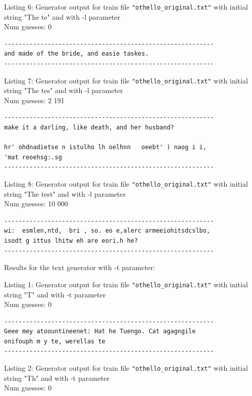 \documentclass{article}
\begin{document}
Listing 6: Generator output for train file \verb|"othello_original.txt"| with initial string "The te" and with -l parameter
\\Num guesses: 0

\begin{lstlisting}
----------------------------------------------------------
and made of the bride, and easie taskes.
----------------------------------------------------------
\end{lstlisting}

Listing 7: Generator output for train file \verb|"othello_original.txt"| with initial string "The tes" and with -l parameter
\\Num guesses: 2 191

\begin{lstlisting}
----------------------------------------------------------
make it a darling, like death, and her husband?

hr' ohdnadietse n istulho lh oelhnn   oeebt' ) naog i i, 
'mat reoehsg:.sg
----------------------------------------------------------
\end{lstlisting}

Listing 8: Generator output for train file \verb|"othello_original.txt"| with initial string "The test" and with -l parameter
\\Num guesses: 10 000

\begin{lstlisting}
----------------------------------------------------------
wi:  esmlen,ntd,  bri , so. eo e,alerc armeeiohitsdcslbo,
isodt g ittus lhitw eh are eori.h he?
----------------------------------------------------------
\end{lstlisting}



Results for the text generator with -t parameter:


\hfill

Listing 1: Generator output for train file \verb|"othello_original.txt"| with initial string "T" and with -t parameter
\\Num guesses: 0

\begin{lstlisting}
----------------------------------------------------------
Geee mey atoountineenet: Hat he Tuengo. Cat agagngile 
onifouph m y te, werellas te
----------------------------------------------------------
\end{lstlisting}

Listing 2: Generator output for train file \verb|"othello_original.txt"| with initial string "Th" and with -t parameter
\\Num guesses: 0
\end{document}
